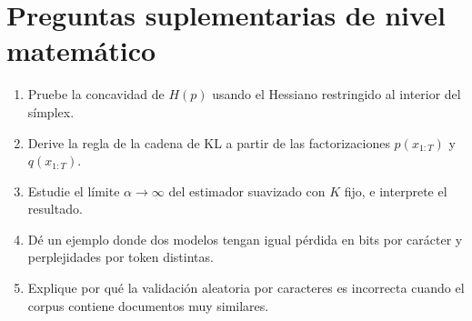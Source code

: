 \documentclass[11pt,a4paper]{report}
\begin{document}
\section{Preguntas suplementarias de nivel matemático}
\begin{enumerate}
\item Pruebe la concavidad de $H(p)$ usando el Hessiano restringido al
interior del símplex.
\item Derive la regla de la cadena de KL a partir de las factorizaciones
$p(x_{1:T})$ y $q(x_{1:T})$.
\item Estudie el límite $\alpha\to\infty$ del estimador suavizado
con $K$ fijo, e interprete el resultado.
\item Dé un ejemplo donde dos modelos tengan igual pérdida en bits por
carácter y perplejidades por token distintas.
\item Explique por qué la validación aleatoria por caracteres es
incorrecta cuando el corpus contiene documentos muy similares.
\end{enumerate}
\clearpage


\end{document}
